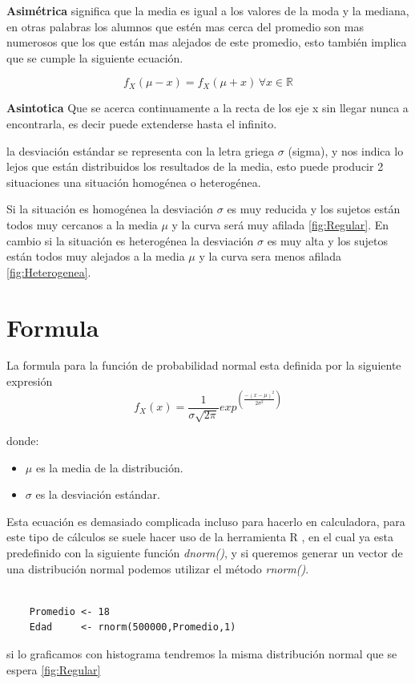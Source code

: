 \documentclass[]{article}
\begin{document}
 \textbf{Asimétrica} significa que la media es igual a los valores de la moda y la mediana, en otras palabras los alumnos que estén mas cerca del promedio son mas numerosos que los que están mas alejados de este promedio, esto también implica que se cumple la siguiente ecuación.
 
\[f_X(\mu - x) = f_X(\mu + x) \, \forall x\in \mathbb{R} \]

  
\textbf{Asintotica} Que se acerca continuamente a la recta de los eje x sin llegar nunca a encontrarla, es decir puede extenderse hasta el infinito.


 la desviación estándar se representa con la letra griega $\sigma$ (sigma), y nos indica lo lejos que están distribuidos los resultados de la media, esto puede producir 2 situaciones una situación homogénea o heterogénea.
 
Si la situación es homogénea la desviación $\sigma$ es muy reducida y los sujetos están todos muy cercanos a la media $\mu$ y la curva será muy afilada \autoref{fig:Regular}.
En cambio si la situación es heterogénea la desviación $\sigma$ es muy alta y los sujetos están todos muy alejados a la media $\mu$ y la curva sera menos afilada \autoref{fig:Heterogenea}.

\section{Formula}
La formula para la función de probabilidad normal esta definida por la siguiente expresión
\[f_X(x) = \frac{1}{\sigma \sqrt{2\pi }}exp^{(\frac{-(x-\mu)^{2}}{2\sigma^{2} })}\]

donde:
\begin{itemize}
	\item $\mu$ es la media de la distribución.
	\item $\sigma$ es la desviación estándar.
\end{itemize}
 Esta ecuación es demasiado complicada incluso para hacerlo en calculadora, para este tipo de cálculos se suele hacer uso de la herramienta R \cite{rproject} , en el cual ya esta predefinido con la siguiente función \textit{dnorm()}, y si queremos
generar un vector de una distribución normal podemos utilizar
el método \textit{rnorm()}.
  \begin{lstlisting}

    Promedio <- 18
    Edad     <- rnorm(500000,Promedio,1)
   \end{lstlisting}

 si lo graficamos con histograma tendremos la misma distribución normal que se espera \autoref{fig:Regular}
\end{document}
